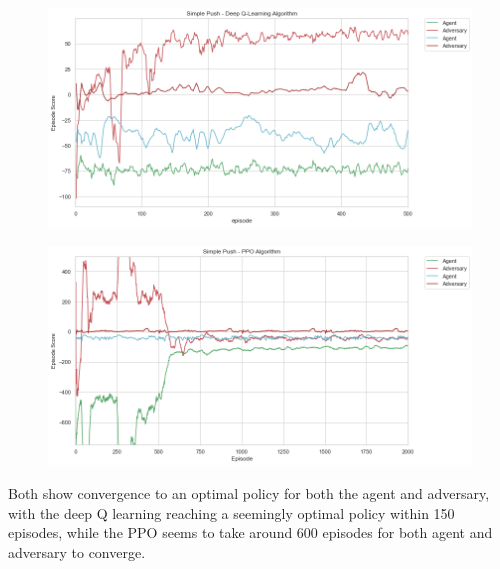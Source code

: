 \documentclass{article}
\begin{document}
\begin{figure}[!ht]
\hspace*{-1cm}
  \centering
  \begin{minipage}{.6\linewidth} 
    \centering
    \includegraphics[width=\linewidth]{push_DQN.png}
    \label{fig:DQNPUSH}
  \end{minipage}%
  \begin{minipage}{.6\linewidth}
    \centering
    \includegraphics[width=\linewidth]{push_PPO.png}
    \label{fig:PPOPUSH}
  \end{minipage}
\end{figure}


Both show convergence to an optimal policy for both the agent and adversary, with the deep Q learning reaching a seemingly optimal policy within 150 episodes, while the PPO seems to take around 600 episodes for both agent and adversary to converge.
\end{document}
